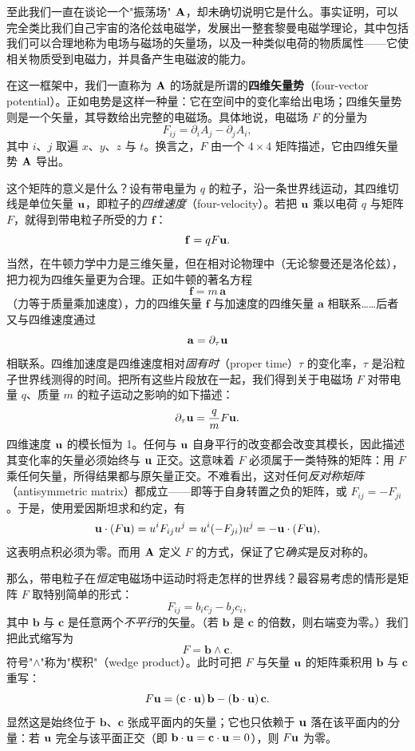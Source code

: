 至此我们一直在谈论一个"振荡场" $\mathbf{A}$，却未确切说明它是什么。事实证明，可以完全类比我们自己宇宙的洛伦兹电磁学，发展出一整套黎曼电磁学理论，其中包括我们可以合理地称为电场与磁场的矢量场，以及一种类似电荷的物质属性——它使相关物质受到电磁力，并具备产生电磁波的能力。

在这一框架中，我们一直称为 $\mathbf{A}$ 的场就是所谓的\textbf{四维矢量势}（four-vector potential）。正如电势是这样一种量：它在空间中的变化率给出电场；四维矢量势则是一个矢量，其导数给出完整的电磁场。具体地说，电磁场 $F$ 的分量为
\[
F_{ij} = \partial_i A_j - \partial_j A_i,
\]
其中 $i$、$j$ 取遍 $x$、$y$、$z$ 与 $t$。换言之，$F$ 由一个 $4\times4$ 矩阵描述，它由四维矢量势 $\mathbf{A}$ 导出。

这个矩阵的意义是什么？设有带电量为 $q$ 的粒子，沿一条世界线运动，其四维切线是单位矢量 $\mathbf{u}$，即粒子的\emph{四维速度}（four-velocity）。若把 $\mathbf{u}$ 乘以电荷 $q$ 与矩阵 $F$，就得到带电粒子所受的力 $\mathbf{f}$：
\[
\mathbf{f} = q F \mathbf{u}.
\]
当然，在牛顿力学中力是三维矢量，但在相对论物理中（无论黎曼还是洛伦兹），把力视为四维矢量更为合理。正如牛顿的著名方程
\[
\mathbf{f} = m\,\mathbf{a}
\]
（力等于质量乘加速度），力的四维矢量 $\mathbf{f}$ 与加速度的四维矢量 $\mathbf{a}$ 相联系……后者又与四维速度通过
\[
\mathbf{a} = \partial_{\tau}\mathbf{u}
\]
相联系。四维加速度是四维速度相对\emph{固有时}（proper time）$\tau$ 的变化率，$\tau$ 是沿粒子世界线测得的时间。把所有这些片段放在一起，我们得到关于电磁场 $F$ 对带电量 $q$、质量 $m$ 的粒子运动之影响的如下描述：
\[
\partial_{\tau}\mathbf{u} = \frac{q}{m} F \mathbf{u}.
\]
四维速度 $\mathbf{u}$ 的模长恒为 1。任何与 $\mathbf{u}$ 自身平行的改变都会改变其模长，因此描述其变化率的矢量必须始终与 $\mathbf{u}$ 正交。这意味着 $F$ 必须属于一类特殊的矩阵：用 $F$ 乘任何矢量，所得结果都与原矢量正交。不难看出，这对任何\emph{反对称矩阵}（antisymmetric matrix）都成立——即等于自身转置之负的矩阵，或 $F_{ij} = -F_{ji}$。于是，使用爱因斯坦求和约定，有
\[
\mathbf{u} \cdot (F\mathbf{u}) = u^{i} F_{ij} u^{j} = u^{i} (-F_{ji}) u^{j} = -\mathbf{u} \cdot (F\mathbf{u}),
\]
这表明点积必须为零。而用 $\mathbf{A}$ 定义 $F$ 的方式，保证了它\emph{确实}是反对称的。

那么，带电粒子在\emph{恒定}电磁场中运动时将走怎样的世界线？最容易考虑的情形是矩阵 $F$ 取特别简单的形式：
\[
F_{ij} = b_i c_j - b_j c_i,
\]
其中 $\mathbf{b}$ 与 $\mathbf{c}$ 是任意两个\emph{不平行}的矢量。（若 $\mathbf{b}$ 是 $\mathbf{c}$ 的倍数，则右端变为零。）我们把此式缩写为
\[
F = \mathbf{b} \wedge \mathbf{c}.
\]
符号"$\wedge$"称为"楔积"（wedge product）。此时可把 $F$ 与矢量 $\mathbf{u}$ 的矩阵乘积用 $\mathbf{b}$ 与 $\mathbf{c}$ 重写：
\[
F\mathbf{u} = (\mathbf{c}\cdot\mathbf{u})\,\mathbf{b} - (\mathbf{b}\cdot\mathbf{u})\,\mathbf{c}.
\]
显然这是始终位于 $\mathbf{b}$、$\mathbf{c}$ 张成平面内的矢量；它也只依赖于 $\mathbf{u}$ 落在该平面内的分量：若 $\mathbf{u}$ 完全与该平面正交（即 $\mathbf{b}\cdot\mathbf{u} = \mathbf{c}\cdot\mathbf{u} = 0$），则 $F\mathbf{u}$ 为零。


